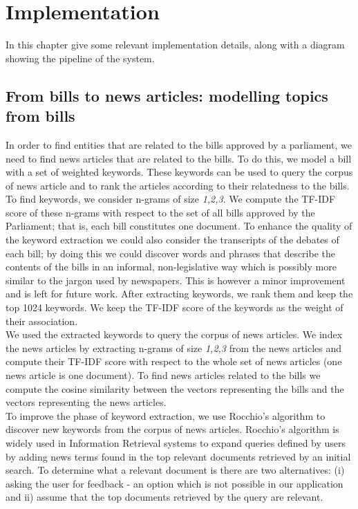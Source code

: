 
\section{Implementation}\label{sec:implementation}

In this chapter give some relevant implementation details, along with a diagram showing the pipeline of the system. \\

\subsection{From bills to news articles: modelling topics from bills }\label{subsec:topic}

In order to find entities that are related to the bills approved by a parliament, we need to find news articles that are related to the bills. To do this, we model a bill with a set of weighted keywords. These keywords can be used to query the corpus of news article and to rank the articles according to their relatedness to the bills. \\

To find keywords, we consider n-grams of size \emph{1,2,3}. We compute the TF-IDF score of these n-grams with respect to the set of all bills approved by the Parliament; that is, each bill constitutes one document. To enhance the quality of the keyword extraction we could also consider the transcripts of the debates of each bill; by doing this we could discover words and phrases that describe the contents of the bills in an informal, non-legislative way which is possibly more similar to the jargon used by newspapers. This is however a minor improvement and is left for future work. After extracting keywords, we rank them and keep the top 1024 keywords. We keep the TF-IDF score of the keywords as the weight of their association. \\

We used the extracted keywords to query the corpus of news articles. We index the news articles by extracting n-grams of size \emph{1,2,3} from the news articles and compute their TF-IDF score with respect to the whole set of news articles (one news article is one document). To find news articles related to the bills we compute the cosine similarity between the vectors representing the bills and the vectors representing the news articles. \\

To improve the phase of keyword extraction, we use Rocchio's algorithm to discover new keywords from the corpus of news articles. Rocchio's algorithm is widely used in Information Retrieval systems to expand queries defined by users by adding news terms found in the top relevant documents retrieved by an initial search. To determine what a relevant document is there are two alternatives: (i) asking the user for feedback - an option which is not possible in our application and ii) assume that the top documents retrieved by the query are relevant. \\

